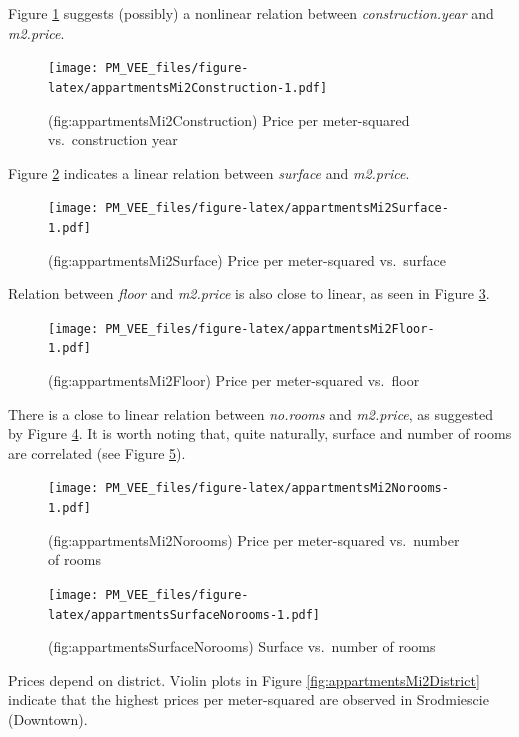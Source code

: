 \documentclass[12pt,]{krantz}
\begin{document}
Figure \ref{fig:appartmentsMi2Construction} suggests (possibly) a nonlinear relation between \emph{construction.year} and \emph{m2.price}.

\begin{figure}
\centering
\texttt{[image: PM\_VEE\_files/figure-latex/appartmentsMi2Construction-1.pdf]}
\caption{\label{fig:appartmentsMi2Construction}(fig:appartmentsMi2Construction) Price per meter-squared vs.~construction year}
\end{figure}

Figure \ref{fig:appartmentsMi2Surface} indicates a linear relation between \emph{surface} and \emph{m2.price}.

\begin{figure}
\centering
\texttt{[image: PM\_VEE\_files/figure-latex/appartmentsMi2Surface-1.pdf]}
\caption{\label{fig:appartmentsMi2Surface}(fig:appartmentsMi2Surface) Price per meter-squared vs.~surface}
\end{figure}

Relation between \emph{floor} and \emph{m2.price} is also close to linear, as seen in Figure \ref{fig:appartmentsMi2Floor}.

\begin{figure}
\centering
\texttt{[image: PM\_VEE\_files/figure-latex/appartmentsMi2Floor-1.pdf]}
\caption{\label{fig:appartmentsMi2Floor}(fig:appartmentsMi2Floor) Price per meter-squared vs.~floor}
\end{figure}

There is a close to linear relation between \emph{no.rooms} and \emph{m2.price}, as suggested by Figure \ref{fig:appartmentsMi2Norooms}. It is worth noting that, quite naturally, surface and number of rooms are correlated (see Figure \ref{fig:appartmentsSurfaceNorooms}).

\begin{figure}
\centering
\texttt{[image: PM\_VEE\_files/figure-latex/appartmentsMi2Norooms-1.pdf]}
\caption{\label{fig:appartmentsMi2Norooms}(fig:appartmentsMi2Norooms) Price per meter-squared vs.~number of rooms}
\end{figure}

\begin{figure}
\centering
\texttt{[image: PM\_VEE\_files/figure-latex/appartmentsSurfaceNorooms-1.pdf]}
\caption{\label{fig:appartmentsSurfaceNorooms}(fig:appartmentsSurfaceNorooms) Surface vs.~number of rooms}
\end{figure}

Prices depend on district. Violin plots in Figure \ref{fig:appartmentsMi2District} indicate that the highest prices per meter-squared are observed in Srodmiescie (Downtown).
\end{document}
